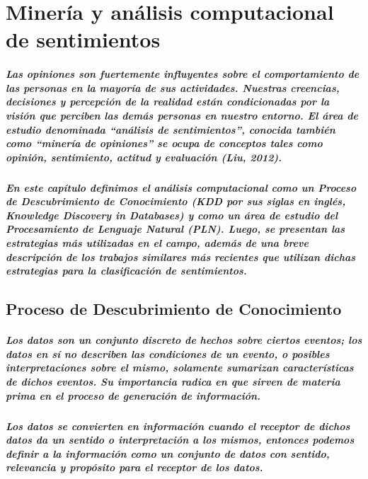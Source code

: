 \chapter {Miner\'ia y an\'alisis computacional de sentimientos}\label{Mineria}

\paragraph{Las opiniones son fuertemente influyentes sobre el comportamiento de las personas en la mayor\'ia de sus actividades. Nuestras creencias, decisiones y percepci\'on de la realidad est\'an condicionadas por la visi\'on que perciben las dem\'as personas en nuestro entorno. El \'area de estudio denominada ``an\'alisis de sentimientos'', conocida tambi\'en como ``miner\'ia de opiniones'' se ocupa de conceptos tales como opini\'on, sentimiento, actitud y evaluaci\'on (Liu, 2012).}
\paragraph{En este cap\'itulo definimos el an\'alisis computacional como un Proceso de Descubrimiento de Conocimiento (KDD por sus siglas en ingl\'es, \textit{Knowledge Discovery in Databases}) y como un \'area de estudio del Procesamiento de Lenguaje Natural (PLN). Luego, se presentan las estrategias m\'as utilizadas en el campo, adem\'as de una breve descripci\'on de los trabajos similares m\'as recientes que utilizan dichas estrategias para la clasificaci\'on de sentimientos.}

\section{Proceso de Descubrimiento de Conocimiento}
\paragraph{Los datos son un conjunto discreto de hechos sobre ciertos eventos; los datos en s\'i no describen las condiciones de un evento, o posibles interpretaciones sobre el mismo, solamente sumarizan caracter\'isticas de dichos eventos. Su importancia radica en que sirven de materia prima en el proceso de generaci\'on de informaci\'on.}
\paragraph{Los datos se convierten en informaci\'on cuando el receptor de dichos datos da un sentido o interpretaci\'on a los mismos, entonces podemos definir a la informaci\'on como un conjunto de datos con sentido, relevancia y prop\'osito para el receptor de los datos.}
